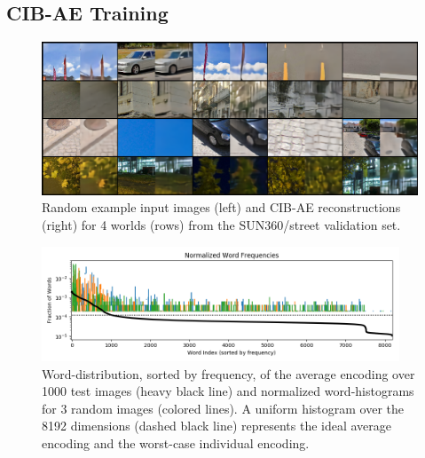 \subsection{CIB-AE Training}
\begin{figure}
    \centering
    \includegraphics[width=\textwidth]{figures/ptz/mc3ae_encodings}
    \caption{Random example input images (left) and CIB-AE reconstructions (right) for 4 worlds (rows) from the SUN360/street validation set.}
    \label{fig:cibae_encodings}
\end{figure}

\begin{figure}
    \centering
    \includegraphics[width=0.95\textwidth]{figures/ptz/word_frequency}
    \caption{Word-distribution, sorted by frequency, of the average encoding over 1000 test images (heavy black line) and normalized
             word-histograms for 3 random images (colored lines). A uniform histogram over the 8192 dimensions (dashed black line) represents the ideal average encoding and the worst-case individual encoding.}
    \label{fig:cibae-words-distribution}
\end{figure}

